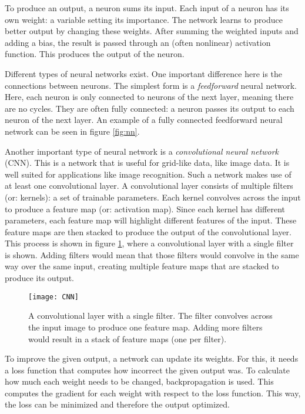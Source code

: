 To produce an output, a neuron sums its input. Each input of a neuron has its own weight: a variable setting its importance. The network learns to produce better output by changing these weights. After summing the weighted inputs and adding a bias, the result is passed through an (often nonlinear) activation function. This produces the output of the neuron. 

Different types of neural networks exist. One important difference here is the connections between neurons. The simplest form is a \emph{feedforward} neural network. Here, each neuron is only connected to neurons of the next layer, meaning there are no cycles. They are often fully connected: a neuron passes its output to each neuron of the next layer. An example of a fully connected feedforward neural network can be seen in figure \ref{fig:nn}.

Another important type of neural network is a \emph{convolutional neural network} (CNN). This is a network that is useful for grid-like data, like image data. It is well suited for applications like image recognition. Such a network makes use of at least one convolutional layer. A convolutional layer consists of multiple filters (or: kernels): a set of trainable parameters. Each kernel convolves across the input to produce a feature map (or: activation map). Since each kernel has different parameters, each feature map will highlight different features of the input. These feature maps are then stacked to produce the output of the convolutional layer. This process is shown in figure \ref{fig:cnn}, where a convolutional layer with a single filter is shown. Adding filters would mean that those filters would convolve in the same way over the same input, creating multiple feature maps that are stacked to produce its output.

\begin{figure}[h]
    \centering
    \texttt{[image: CNN]}
    \caption{A convolutional layer with a single filter. The filter convolves across the input image to produce one feature map. Adding more filters would result in a stack of feature maps (one per filter).}
    \label{fig:cnn}
\end{figure}

To improve the given output, a network can update its weights. For this, it needs a loss function that computes how incorrect the given output was. To calculate how much each weight needs to be changed, backpropagation is used. This computes the gradient for each weight with respect to the loss function. This way, the loss can be minimized and therefore the output optimized.

